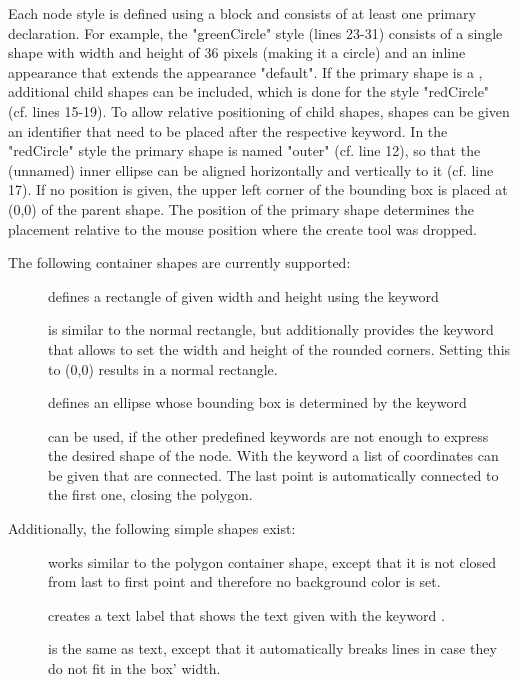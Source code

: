 \documentclass[a4paper,american,12pt]{scrreprt}
\begin{document}
Each node style is defined using a   block and
consists of at least one primary  declaration. For example, the
"greenCircle" style (lines 23-31) consists of a single  shape with
width and height of 36 pixels (making it a circle) and an
inline appearance that extends the appearance "default". If the primary shape is
a , additional child shapes can be included, which is
done for the style "redCircle" (cf. lines 15-19). To allow relative positioning
of child shapes, shapes can be given an identifier that need to be placed after
the respective keyword. In the "redCircle" style the primary shape is named
"outer" (cf. line 12), so that the (unnamed) inner ellipse can be aligned
horizontally and vertically to it (cf. line 17). If no position is given, the
upper left corner of the bounding box is placed at (0,0) of the parent shape.
The position of the primary shape determines the placement relative to the mouse
position where the create tool was dropped.

The following container shapes are currently supported:
\begin{description}
\item[] defines a rectangle of given width and height using the
 keyword
\item[] is similar to the normal rectangle, but
additionally provides the  keyword that allows to set the width and
height of the rounded corners. Setting this to (0,0) results in a normal
rectangle.
\item[] defines an ellipse whose bounding box is determined by the
 keyword
\item[] can be used, if the other predefined keywords are not enough to
express the desired shape of the node. With the  keyword a list of
coordinates can be given that are connected. The last point is
automatically connected to the first one, closing the polygon.
\end{description}
%
\FloatBarrier


Additionally, the following simple shapes exist:

\begin{description}
\item[] works similar to the polygon container shape, except that
it is not closed from last to first point and therefore no background color is
set.
\item[] creates a text label that shows the text given with the keyword
.
\item[] is the same as text, except that it 
automatically breaks lines in case they do not fit in the box' width.
\end{description}
\end{document}
